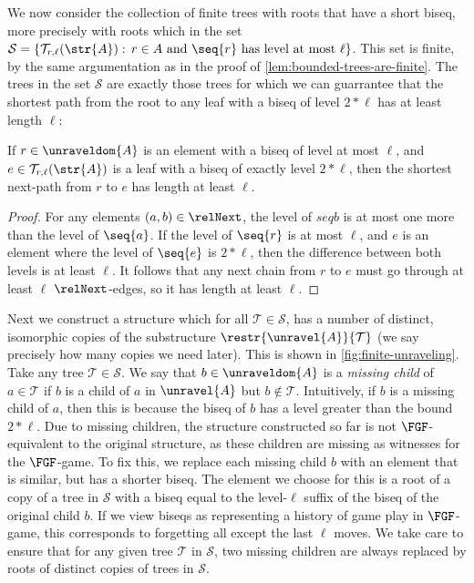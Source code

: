 
\noindent
We now consider the collection of finite trees with roots that have a short biseq, more precisely with roots which in the set $\mathcal{S} = \left\{ \mathcal{T}_{r,\ell}(\str{A}):\, r \in A \text{ and } \seq{r}\ \text{has level at most $\ell$}\right\}$.
This set is finite, by the same argumentation as in the proof of \cref{lem:bounded-trees-are-finite}.
The trees in the set $\mathcal{S}$ are exactly those trees for which we can guarrantee that the shortest path from the root to any leaf with a biseq of level $2 * \ell$ has at least length $\ell$:
\begin{lemma}\label{lem:bounded-trees-shortest-next-path}
  If $r \in \unraveldom{A}$ is an element with a biseq of level at most $\ell$, and $e \in \mathcal{T}_{r,\ell}(\str{A})$ is a leaf with a biseq of exactly level $2 * \ell$, then the shortest next-path from $r$ to $e$ has length at least $\ell$.
\end{lemma}
\begin{proof}
  For any elements $(a,b) \in \relNext$, the level of $seq{b}$ is at most one more than the level of $\seq{a}$.
  If the level of $\seq{r}$ is at most $\ell$, and $e$ is an element where the level of $\seq{e}$ is $2 * \ell$, then the difference between both levels is at least $\ell$.
  It follows that any next chain from $r$ to $e$ must go through at least $\ell$ $\relNext$-edges, so it has length at least $\ell$.
\end{proof}
Next we construct a structure which for all $\mathcal{T} \in \mathcal{S}$, has a number of distinct, isomorphic copies of the substructure $\restr{\unravel{A}}{\mathcal{T}}$ (we say precisely how many copies we need later).
This is shown in \cref{fig:finite-unraveling}.
Take any tree $\mathcal{T} \in \mathcal{S}$.
We say that $b \in \unraveldom{A}$ is a \emph{missing child} of $a \in \mathcal{T}$ if $b$ is a child of $a$ in $\unravel{A}$ but $b \notin \mathcal{T}$.
Intuitively, if $b$ is a missing child of $a$, then this is because the biseq of $b$ has a level greater than the bound $2 * \ell$.
Due to missing children, the structure constructed so far is not $\FGF$-equivalent to the original structure, as these children are missing as witnesses for the $\FGF$-game.
To fix this, we replace each missing child $b$ with an element that is similar, but has a shorter biseq.
The element we choose for this is a root of a copy of a tree in $\mathcal{S}$ with a biseq equal to the level-$\ell$ suffix of the biseq of the original child $b$.
If we view biseqs as representing a history of game play in $\FGF$-game, this corresponds to forgetting all except the last $\ell$ moves.
We take care to ensure that for any given tree $\mathcal{T}$ in $\mathcal{S}$, two missing children are always replaced by roots of distinct copies of trees in $\mathcal{S}$.

